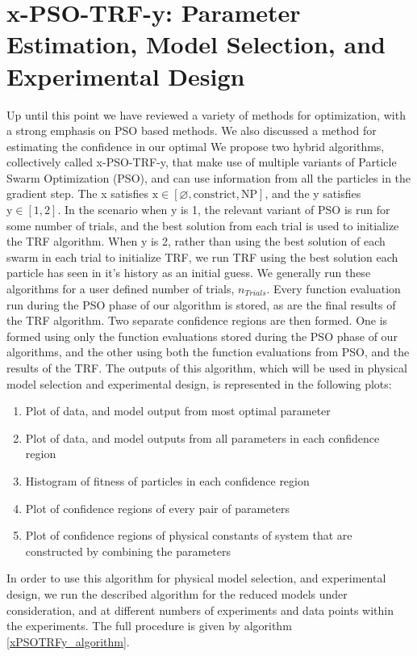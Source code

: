 \section{x-PSO-TRF-y: Parameter Estimation, Model Selection, and Experimental Design}
Up until this point we have reviewed a variety of methods for optimization, with a strong emphasis on PSO based methods. We also discussed a method for estimating the confidence in our optimal  We propose two hybrid algorithms, collectively called x-PSO-TRF-y, that make use of multiple variants of Particle Swarm Optimization (PSO), and can use information from all the particles in the gradient step. The x satisfies $\textrm{x} \in [\varnothing,\textrm{constrict},\textrm{NP}]$, and the y satisfies $\textrm{y} \in [1,2]$. In the scenario when y is 1, the relevant variant of PSO is run for some number of trials, and the best solution from each trial is used to initialize the TRF algorithm. When y is 2, rather than using the best solution of each swarm in each trial to initialize TRF, we run TRF using the best solution each particle has seen in it's history as an initial guess. We generally run these algorithms for a user defined number of trials, $n_{Trials}$. Every function evaluation run during the PSO phase of our  algorithm is stored, as are the final results of the TRF algorithm. Two separate confidence regions are then formed. One is formed using only the function evaluations stored during the PSO phase of our algorithms, and the other using both the function evaluations from PSO, and the results of the TRF. The outputs of this algorithm, which will be used in physical model selection and experimental design, is represented in the following plots: 

\begin{enumerate}
    \item Plot of data, and model output from most optimal parameter
    \item Plot of data, and model outputs from all parameters in each confidence region
    \item Histogram of fitness of particles in each confidence region
    \item Plot of confidence regions of every pair of parameters
    \item Plot of confidence regions of physical constants of system that are constructed by combining the parameters
\end{enumerate}

In order to use this algorithm for physical model selection, and experimental design, we run the described algorithm for the reduced models under consideration, and at different numbers of experiments and data points within the experiments. The full procedure is given by algorithm \ref{xPSOTRFy_algorithm}. 

